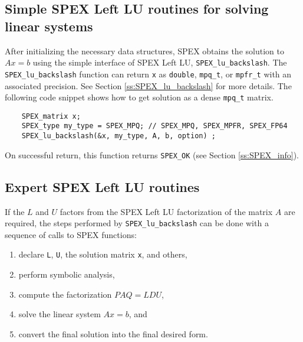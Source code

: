 \documentclass[12pt]{report}
\theoremstyle{definition}
\begin{document}
\cprotect\subsection{Simple SPEX Left LU routines for solving linear systems}
\label{s:Using:simple}

After initializing the necessary data structures, SPEX obtains the solution
to $Ax=b$ using the simple interface of SPEX Left LU, \verb|SPEX_lu_backslash|.  The
\newline \verb|SPEX_lu_backslash| function can return \verb|x| as \verb|double|,
\verb|mpq_t|, or \verb|mpfr_t| with an associated precision.  See Section
\ref{ss:SPEX_lu_backslash} for more details.  The following code snippet shows how
to get solution as a dense \verb|mpq_t| matrix.

{\small
\begin{verbatim}
    SPEX_matrix x;
    SPEX_type my_type = SPEX_MPQ; // SPEX_MPQ, SPEX_MPFR, SPEX_FP64
    SPEX_lu_backslash(&x, my_type, A, b, option) ; \end{verbatim} }

On successful return, this function returns \verb|SPEX_OK| (see Section
\ref{ss:SPEX_info}).

\cprotect\subsection{Expert SPEX Left LU routines}
\label{s:Using:expert}

If the $L$ and $U$ factors from the SPEX Left LU factorization of the matrix $A$
are required, the steps performed by \verb|SPEX_lu_backslash| can be done with
a sequence of calls to SPEX functions:

\begin{enumerate}
\item declare \verb|L|, \verb|U|, the solution matrix \verb|x|, and others,
\item perform symbolic analysis,
\item compute the factorization $PAQ = L D U$,
\item solve the linear system $Ax =b$, and
\item convert the final solution into the final desired form.
\end{enumerate}
\end{document}
